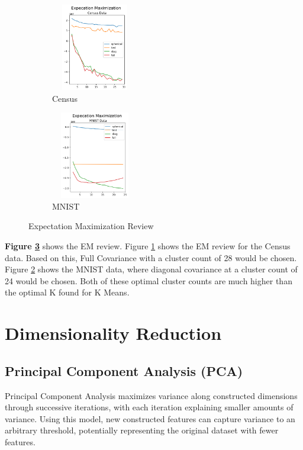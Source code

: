 \documentclass[letterpaper]{article} %
\begin{document}
\begin{figure}[!htb]
	\centering
		\begin{subfigure} [b]{.25\textwidth}
			\centering
			\includegraphics[width=1.5in, height=1.5in]{figures/Expecation_Maximization_Census_Data.png}
			\caption{Census}
			\label{fig:em_census}
		\end{subfigure}%
		\begin{subfigure}[b]  {.25\textwidth}
			\includegraphics[width=1.5in, height=1.5in]{figures/Expecation_Maximization_MNIST_Data.png}
			\caption{MNIST}
			\label{fig:em_mnist}
		\end{subfigure}
		\caption{Expectation Maximization Review}
		\label{fig:expectation_maximization}
\end{figure}

\textbf{Figure \ref{fig:expectation_maximization}} shows the EM review. Figure \ref{fig:em_census}  shows the EM review for the Census data.  Based on this, Full Covariance with a cluster count of 28 would be chosen.  Figure \ref{fig:em_mnist} shows the MNIST data, where diagonal covariance at a cluster count of 24 would be chosen.   Both of these optimal cluster counts are much higher than the optimal K found for K Means.

\section{Dimensionality Reduction}

\subsection{Principal Component Analysis (PCA)}
Principal Component Analysis maximizes variance along constructed dimensions through successive iterations, with each iteration explaining smaller amounts of variance.  Using this model, new constructed features can capture variance to an arbitrary threshold, potentially representing the original dataset with fewer features.  
\end{document}

